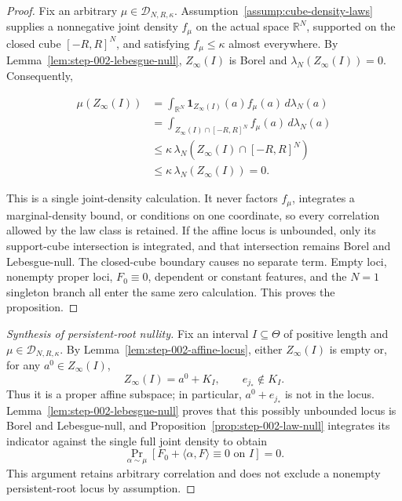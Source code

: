 \begin{proof}
Fix an arbitrary
\(\mu\in\mathcal D_{N,R,\kappa}\). Assumption~\ref{assump:cube-density-laws} supplies a nonnegative joint
density \(f_\mu\) on the actual space \(\mathbb R^N\), supported on the closed cube \([-R,R]^N\), and satisfying
\(f_\mu\leq\kappa\) almost everywhere. By Lemma~\ref{lem:step-002-lebesgue-null},
\(Z_\infty(I)\) is Borel and \(\lambda_N(Z_\infty(I))=0\). Consequently,

\begin{equation}
\label{eq:appendix-display-050}
\begin{aligned}
\mu(Z_\infty(I))
&=\int_{\mathbb R^N}
\mathbf 1_{Z_\infty(I)}(a)f_\mu(a)\,d\lambda_N(a)\\
&=\int_{Z_\infty(I)\cap[-R,R]^N}
f_\mu(a)\,d\lambda_N(a)\\
&\leq
\kappa\,\lambda_N\!\left(Z_\infty(I)\cap[-R,R]^N\right)\\
&\leq
\kappa\,\lambda_N(Z_\infty(I))
=0.
\end{aligned}
\end{equation}

This is a single joint-density calculation. It never factors \(f_\mu\), integrates a marginal-density bound,
or conditions on one coordinate, so every correlation allowed by the law class is retained. If the affine
locus is unbounded, only its support-cube intersection is integrated, and that intersection remains Borel and
Lebesgue-null. The closed-cube boundary causes no separate term. Empty loci, nonempty proper loci,
\(F_0\equiv0\), dependent or constant features, and the \(N=1\) singleton branch all enter the same zero
calculation. This proves the proposition. 
\end{proof}


\begin{proof}[Synthesis of persistent-root nullity]
Fix an interval $I\subseteq\Theta$ of positive length and
$\mu\in\mathcal D_{N,R,\kappa}$.  By
Lemma~\ref{lem:step-002-affine-locus}, either $Z_\infty(I)$ is empty or,
for any $a^0\in Z_\infty(I)$,
\begin{equation}
\label{eq:appendix-display-051}
Z_\infty(I)=a^0+K_I,
\qquad e_{j_*}\notin K_I.
\end{equation}
Thus it is a proper affine subspace; in particular, $a^0+e_{j_*}$ is not
in the locus.  Lemma~\ref{lem:step-002-lebesgue-null} proves that this
possibly unbounded locus is Borel and Lebesgue-null, and
Proposition~\ref{prop:step-002-law-null} integrates its indicator against
the single full joint density to obtain
\begin{equation}
\label{eq:appendix-display-052}
\Pr_{\alpha\sim\mu}
\left[F_0+\langle\alpha,F\rangle\equiv0\text{ on }I\right]=0.
\end{equation}
This argument retains arbitrary correlation and does not exclude a nonempty
persistent-root locus by assumption.
\end{proof}

